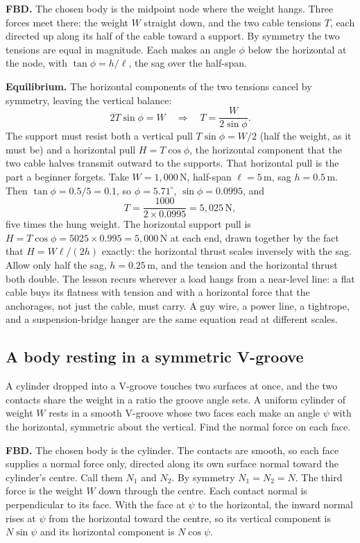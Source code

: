 \textbf{FBD.} The chosen body is the midpoint node where the weight hangs.
Three forces meet there: the weight $W$ straight down, and the two cable
tensions $T$, each directed up along its half of the cable toward a support.
By symmetry the two tensions are equal in magnitude. Each makes an angle
$\phi$ below the horizontal at the node, with $\tan\phi = h/\ell$, the sag
over the half-span.

\textbf{Equilibrium.} The horizontal components of the two tensions cancel
by symmetry, leaving the vertical balance:
\[
2T\sin\phi = W \quad\Longrightarrow\quad T = \frac{W}{2\sin\phi}.
\]
The support must resist both a vertical pull $T\sin\phi = W/2$ (half the
weight, as it must be) and a horizontal pull $H = T\cos\phi$, the horizontal
component that the two cable halves transmit outward to the supports. That
horizontal pull is the part a beginner forgets. Take $W = 1{,}000\,\text{N}$,
half-span $\ell = 5\,\si{\meter}$, sag $h = 0.5\,\si{\meter}$. Then $\tan\phi
= 0.5/5 = 0.1$, so $\phi = 5.71^{\circ}$, $\sin\phi = 0.0995$, and
\[
T = \frac{1000}{2 \times 0.0995} = 5{,}025\,\text{N},
\]
five times the hung weight. The horizontal support pull is $H = T\cos\phi =
5025 \times 0.995 = 5{,}000\,\text{N}$ at each end, drawn together by the
fact that $H = W\ell/(2h)$ exactly: the horizontal thrust scales inversely
with the sag. Allow only half the sag, $h = 0.25\,\si{\meter}$, and the
tension and the horizontal thrust both double. The lesson recurs wherever a
load hangs from a near-level line: a flat cable buys its flatness with
tension and with a horizontal force that the anchorages, not just the cable,
must carry. A guy wire, a power line, a tightrope, and a suspension-bridge
hanger are the same equation read at different scales.

\subsection{A body resting in a symmetric V-groove}

A cylinder dropped into a V-groove touches two surfaces at once, and the
two contacts share the weight in a ratio the groove angle sets. A uniform
cylinder of weight $W$ rests in a smooth V-groove whose two faces each make
an angle $\psi$ with the horizontal, symmetric about the vertical. Find the
normal force on each face.

\textbf{FBD.} The chosen body is the cylinder. The contacts are smooth, so
each face supplies a normal force only, directed along its own surface
normal toward the cylinder's centre. Call them $N_1$ and $N_2$. By symmetry
$N_1 = N_2 = N$. The third force is the weight $W$ down through the centre.
Each contact normal is perpendicular to its face. With the face at $\psi$ to
the horizontal, the inward normal rises at $\psi$ from the horizontal toward
the centre, so its vertical component is $N\sin\psi$ and its horizontal
component is $N\cos\psi$.

